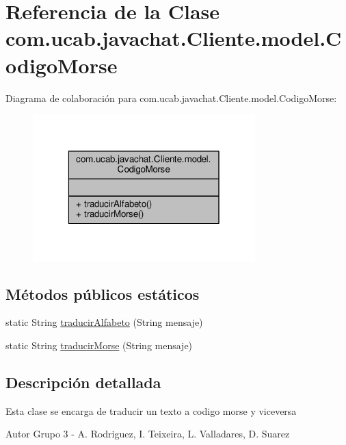 \hypertarget{classcom_1_1ucab_1_1javachat_1_1_cliente_1_1model_1_1_codigo_morse}{\section{Referencia de la Clase com.\-ucab.\-javachat.\-Cliente.\-model.\-Codigo\-Morse}
\label{classcom_1_1ucab_1_1javachat_1_1_cliente_1_1model_1_1_codigo_morse}
}


Diagrama de colaboración para com.\-ucab.\-javachat.\-Cliente.\-model.\-Codigo\-Morse\-:
\nopagebreak
\begin{figure}[H]
\begin{center}
\leavevmode
\includegraphics[width=244pt]{d0/da7/classcom_1_1ucab_1_1javachat_1_1_cliente_1_1model_1_1_codigo_morse__coll__graph}
\end{center}
\end{figure}
\subsection*{Métodos públicos estáticos}
\begin{DoxyCompactItemize}
\item 
static String \hyperlink{classcom_1_1ucab_1_1javachat_1_1_cliente_1_1model_1_1_codigo_morse_a043b70b087c4b8b530dc3eb03289fc98}{traducir\-Alfabeto} (String mensaje)
\item 
static String \hyperlink{classcom_1_1ucab_1_1javachat_1_1_cliente_1_1model_1_1_codigo_morse_aaff032c4492797c05151156469193c35}{traducir\-Morse} (String mensaje)
\end{DoxyCompactItemize}


\subsection{Descripción detallada}
Esta clase se encarga de traducir un texto a codigo morse y viceversa \begin{DoxyAuthor}{Autor}
Grupo 3 -\/ A. Rodriguez, I. Teixeira, L. Valladares, D. Suarez 
\end{DoxyAuthor}


